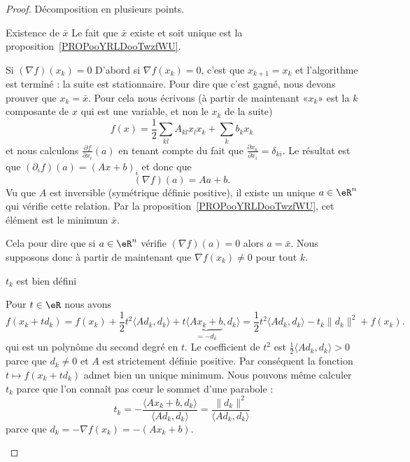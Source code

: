 \begin{proof}
	Décomposition en plusieurs points.
	\begin{subproof}
		\item[Existence de \( \bar x\)]
		Le fait que \( \bar x\) existe et soit unique est la proposition~\ref{PROPooYRLDooTwzfWU}.
		\item[Si \( (\nabla f)(x_k)=0\)]
		D'abord si \( \nabla f(x_k)=0\), c'est que \( x_{k+1}=x_k\) et l'algorithme est terminé : la suite est stationnaire. Pour dire que c'est gagné, nous devons prouver que \( x_k=\bar x\). Pour cela nous écrivons (à partir de maintenant «\( x_k\)» est la \( k\)\ieme composante de \( x\) qui est une variable, et non le \( x_k\) de la suite)
		\begin{equation}
			f(x)=\frac{ 1 }{2}\sum_{kl}A_{kl}x_lx_k+\sum_{k}b_kx_k
		\end{equation}
		et nous calculons \( \frac{ \partial f }{ \partial x_i }(a)\) en tenant compte du fait que \( \frac{ \partial x_k }{ \partial x_i }=\delta_{ki}\). Le résultat est que \( (\partial_if)(a)=(Ax+b)_i\) et donc que
		\begin{equation}
			(\nabla f)(a)=Aa+b.
		\end{equation}
		Vu que \( A\) est inversible (symétrique définie positive), il existe un unique \( a\in \eR^n\) qui vérifie cette relation. Par la proposition~\ref{PROPooYRLDooTwzfWU}, cet élément est le minimum \( \bar x\).

		Cela pour dire que si \( a\in \eR^n\) vérifie \( (\nabla f)(a)=0\) alors \( a=\bar x\). Nous supposons donc à partir de maintenant que \( \nabla f(x_k)\neq 0\) pour tout \( k\).
		\item[\( t_k\) est bien défini]

		Pour \( t\in \eR\) nous avons
		\begin{equation}    \label{EqKEHooYaazQi}
			f(x_k+td_k)=f(x_k)+\frac{ 1 }{2}t^2\langle Ad_k, d_k\rangle +t\langle \underbrace{Ax_k+b}_{=-d_k}, d_k\rangle=\frac{ 1 }{2}t^2\langle Ad_k, d_k\rangle -t_k\| d_k \|^2 +f(x_k).
		\end{equation}
		qui est un polynôme du second degré en \( t\). Le coefficient de \( t^2\) est \( \frac{ 1 }{2}\langle Ad_k, d_k\rangle >0\) parce que \( d_k\neq 0\) et \( A\) est strictement définie positive. Par conséquent la fonction \( t\mapsto f(x_k+td_k)\) admet bien un unique minimum. Nous pouvons même calculer \( t_k\) parce que l'on connaît pas cœur le sommet d'une parabole :
		\begin{equation}    \label{EqVWJooWmDSER}
			t_k=-\frac{ \langle Ax_k+b, d_k\rangle  }{ \langle Ad_k, d_k\rangle  }=\frac{ \| d_k \|^2 }{ \langle Ad_k, d_k\rangle  }
		\end{equation}
		parce que \( d_k=-\nabla f(x_k)=-(Ax_k+b)\).


\end{subproof}
\end{proof}
